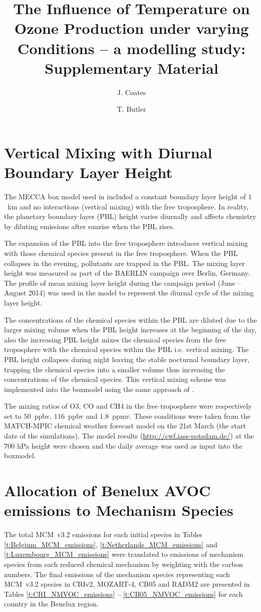 \documentclass[11pt,a4paper]{article}
\title{The Influence of Temperature on Ozone Production under varying \ce{NO_x} Conditions -- a modelling study: Supplementary Material}
\author[1]{J. Coates}
\author[1]{T. Butler}
\affil[1]{Institute for Advanced Sustainability Studies, Potsdam, Germany}
\begin{document}
\maketitle

\section{Vertical Mixing with Diurnal Boundary Layer Height} 
The MECCA box model used in \citet{Coates:2015} included a constant boundary layer height of $1$~km and no interactions (vertical mixing) with the free troposphere.
In reality, the planetary boundary layer (PBL) height varies diurnally and affects chemistry by diluting emissions after sunrise when the PBL rises. 

The expansion of the PBL into the free troposphere introduces vertical mixing with those chemical species present in the free troposphere. 
When the PBL collapses in the evening, pollutants are trapped in the PBL.  
The mixing layer height was measured as part of the BAERLIN campaign \citep{Bonn:2016} over Berlin, Germany. 
The profile of mean mixing layer height during the campaign period (June -- August 2014) was used in the model to represent the diurnal cycle of the mixing layer height.

The concentrations of the chemical species within the PBL are diluted due to the larger mixing volume when the PBL height increases at the beginning of the day, also the increasing PBL height mixes the chemical species from the free troposphere with the chemical species within the PBL i.e. vertical mixing. 
The PBL height collapses during night leaving the stable nocturnal boundary layer, trapping the chemical species into a smaller volume thus increasing the concentrations of the chemical species.
This vertical mixing scheme was implemented into the boxmodel using the same approach of \citet{Lourens:2012}.

The mixing ratios of O3, CO and CH4 in the free troposphere were respectively set to $50$~ppbv, $116$~ppbv and $1.8$~ppmv. 
These conditions were taken from the MATCH-MPIC chemical weather forecast model on the 21st March (the start date of the simulations). 
The model results (\url{http://cwf.iass-potsdam.de/}) at the 700 hPa height were chosen and the daily average was used as input into the boxmodel.

\section{Allocation of Benelux AVOC emissions to Mechanism Species}
The total MCM~v3.2 emissions for each initial species in Tables \ref{t:Belgium_MCM_emissions}, \ref{t:Netherlands_MCM_emissions} and \ref{t:Luxembourg_MCM_emissions} were translated to emissions of mechanism species from each reduced chemical mechanism by weighting with the carbon numbers. 
The final emissions of the mechanism species representing each MCM~v3.2 species in CRIv2, MOZART-4, CB05 and RADM2 are presented in Tables \ref{t:CRI_NMVOC_emissions} -- \ref{t:CB05_NMVOC_emissions} for each country in the Benelux region.
\end{document}
